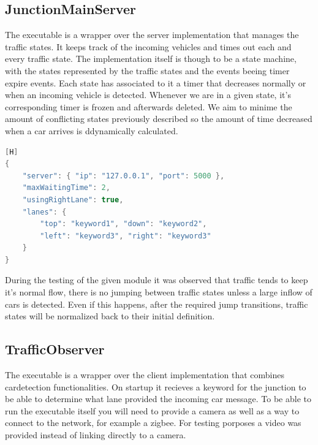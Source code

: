 \documentclass[17pt]{article}
\begin{document}
\subsection{JunctionMainServer}

\indent \indent
The executable is a wrapper over the server implementation that manages the traffic states.
It keeps track of the incoming vehicles and times out each and every traffic state. The 
implementation itself is though to be a state machine, with the states represented by the 
traffic states and the events beeing timer expire events. Each state has associated to it 
a timer that decreases normally or when an incoming vehicle is detected. Whenever we 
are in a given state, it's corresponding timer is frozen and afterwards deleted. We aim to 
minime the amount of conflicting states previously described so the amount of time decreased
when a car arrives is ddynamically calculated. 

\begin{lstlisting}[language = C++][H]
{ 
    "server": { "ip": "127.0.0.1", "port": 5000 },
    "maxWaitingTime": 2,
    "usingRightLane": true,
    "lanes": { 
        "top": "keyword1", "down": "keyword2",
        "left": "keyword3", "right": "keyword3"
    } 
}
\end{lstlisting}

During the testing of the given module it was observed that traffic tends to keep it's 
normal flow, there is no jumping between traffic states unless a large inflow of cars is 
detected. Even if this happens, after the required jump transitions, traffic states will 
be normalized back to their initial definition.

\pagebreak
\subsection{TrafficObserver}
\indent \indent
The executable is a wrapper over the client implementation that combines
cardetection functionalities. On startup it recieves a keyword for the junction to be able
to determine what lane provided the incoming car message. To be able to run 
the executable itself you will need to provide a camera as well as a way to 
connect to the network, for example a zigbee. For testing porposes a
video was provided instead of linking directly to a camera.
\end{document}
